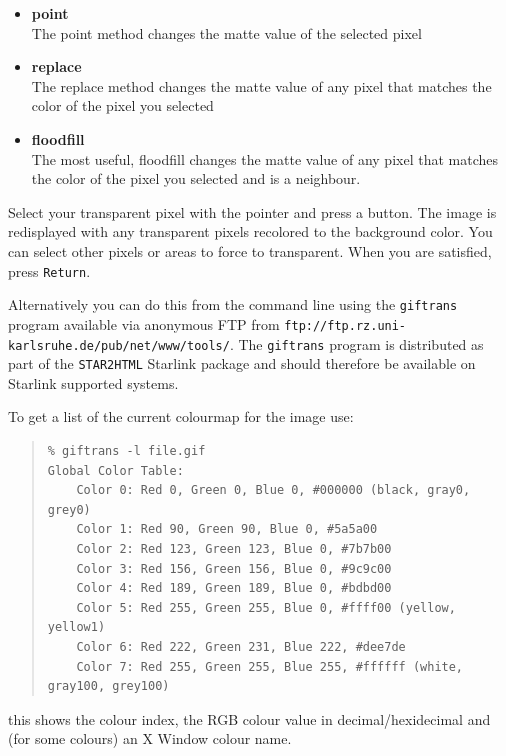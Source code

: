 \documentclass[twoside,11pt]{article}
\newcommand{\htmladdnormallink}[2]{#1}
\newcommand{\latex}[1]{#1}
\begin{document}
\begin{itemize}
\item{{\bf point}}\\
The point method changes the matte value of the selected pixel
\item{{\bf replace}}\\
The replace method changes the matte value of any pixel that matches the color of the pixel you selected
\item{{\bf floodfill}}\\
The most useful, floodfill changes the matte value of any pixel that matches the color of the pixel you selected and is a neighbour.
\end{itemize}

Select your transparent pixel with the pointer and press a button. The image is redisplayed with any transparent pixels recolored to the background color. You can select other pixels or areas to force to transparent. When you are satisfied, press {\tt Return}. 

Alternatively you can do this from the command line using the \htmladdnormallink{{\tt giftrans}}{ftp://ftp.rz.uni-karlsruhe.de/pub/net/www/tools/} program\latex{ available via anonymous FTP from \htmladdnormallink{{\tt ftp://ftp.rz.uni-karlsruhe.de/pub/net/www/tools/}}{ftp://ftp.rz.uni-karlsruhe.de/pub/net/www/tools/}}. The {\tt giftrans} program is distributed as part of the {\tt STAR2HTML} Starlink package and should therefore be available on Starlink supported systems.

To get a list of the current colourmap for the image use:

\small
\begin{quote}
\begin{verbatim}
% giftrans -l file.gif
Global Color Table:
    Color 0: Red 0, Green 0, Blue 0, #000000 (black, gray0, grey0)
    Color 1: Red 90, Green 90, Blue 0, #5a5a00
    Color 2: Red 123, Green 123, Blue 0, #7b7b00
    Color 3: Red 156, Green 156, Blue 0, #9c9c00
    Color 4: Red 189, Green 189, Blue 0, #bdbd00
    Color 5: Red 255, Green 255, Blue 0, #ffff00 (yellow, yellow1)
    Color 6: Red 222, Green 231, Blue 222, #dee7de
    Color 7: Red 255, Green 255, Blue 255, #ffffff (white, gray100, grey100)
\end{verbatim}
\end{quote}
\normalsize

this shows the colour index, the RGB colour value in decimal/hexidecimal and (for some colours) an X Window colour name.
\end{document}
